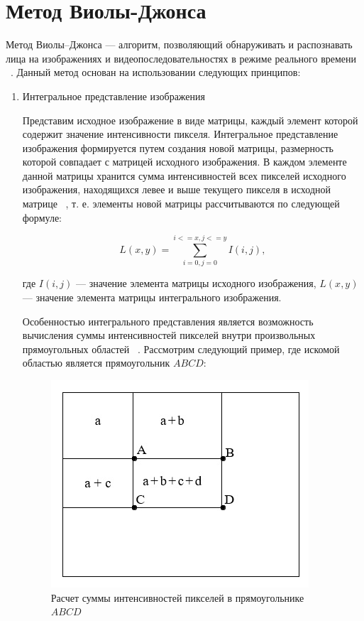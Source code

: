 \chapter{Метод Виолы-Джонса}

Метод Виолы--Джонса --- алгоритм, позволяющий обнаруживать и распознавать лица на изображениях и видеопоследовательностях в режиме реального времени ~\cite{viola}. Данный метод основан на использовании следующих принципов:
\begin{enumerate}[label=\arabic*.]
    \item Интегральное представление изображения

    Представим исходное изображение в виде матрицы, каждый элемент которой содержит значение интенсивности пикселя. Интегральное представление изображения формируется путем создания новой матрицы, размерность которой совпадает с матрицей исходного изображения. В каждом элементе данной матрицы хранится сумма интенсивностей всех пикселей исходного изображения, находящихся левее и выше текущего пикселя в исходной матрице ~\cite{tomsk}, т. е. элементы новой матрицы рассчитываются по следующей формуле:
    
    \begin{equation}
        L(x,y) = \sum_{i=0, j=0}^{i<=x, j<=y} I(i,j),
    \end{equation}

    где $I(i, j)$ --- значение элемента матрицы исходного изображения, $L(x,y)$ --- значение элемента матрицы интегрального изображения.

    Особенностью интегрального представления является возможность вычисления суммы интенсивностей пикселей внутри произвольных прямоугольных областей ~\cite{tomsk}. Рассмотрим следующий пример, где искомой областью является прямоугольник $ABCD$:

    \begin{figure}[h]
	\centering
	\includegraphics[height=0.25\textheight]{img/integral.jpg}
	\caption{Расчет суммы интенсивностей пикселей в прямоугольнике $ABCD$}
    \label{img:integral}
    \end{figure}


\end{enumerate}
